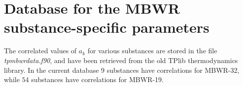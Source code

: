 \documentclass[english]{../thermomemo/thermomemo}
\numberwithin{equation}{section}
\begin{document}
% 

\section{Database for the MBWR substance-specific parameters}
The correlated values of $a_k$ for various substances are stored in
the file \textit{tpmbwrdata.f90}, and have been retrieved from the old
TPlib thermodynamics library. In the current database $9$ substances
have correlations for MBWR-32, while $54$ substances have
correlations for MBWR-19.
\end{document}
